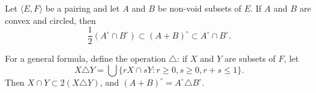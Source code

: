Let $\langle E, F \rangle$ be a pairing and let $A$ and $B$ be non-void subsets of $E$. If $A$ and $B$ are convex and circled, then
$$\frac{1}{2}(A^\circ \cap B^\circ) \subset (A + B)^\circ \subset A^\circ \cap B^\circ.$$

For a general formula, define the operation $\triangle$: if $X$ and $Y$ are subsets of $F$, let
$$X \triangle Y = \bigcup \{ rX \cap sY : r \geq 0, s \geq 0, r + s \leq 1 \}.$$
Then $X \cap Y \subset 2(X \triangle Y)$, and $(A + B)^\circ = A^\circ \triangle B^\circ$.
